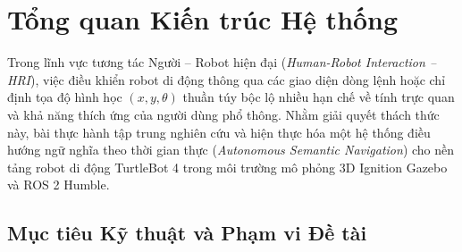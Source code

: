 \section{Tổng quan Kiến trúc Hệ thống}
\label{sec:architecture}

Trong lĩnh vực tương tác Người -- Robot hiện đại (\textit{Human-Robot Interaction -- HRI}), việc điều khiển robot di động thông qua các giao diện dòng lệnh hoặc chỉ định tọa độ hình học $(x, y, \theta)$ thuần túy bộc lộ nhiều hạn chế về tính trực quan và khả năng thích ứng của người dùng phổ thông. Nhằm giải quyết thách thức này, bài thực hành tập trung nghiên cứu và hiện thực hóa một hệ thống điều hướng ngữ nghĩa theo thời gian thực (\textit{Autonomous Semantic Navigation}) cho nền tảng robot di động TurtleBot 4 trong môi trường mô phỏng 3D Ignition Gazebo và ROS 2 Humble.

\subsection{Mục tiêu Kỹ thuật và Phạm vi Đề tài}

